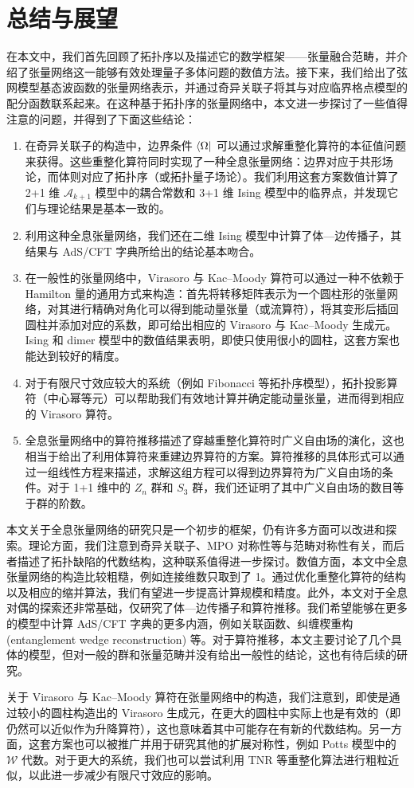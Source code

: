 \chapter{总结与展望}
\label{chap:conclusion}

在本文中，我们首先回顾了拓扑序以及描述它的数学框架——张量融合范畴，并介绍了张量网络这一能够有效处理量子多体问题的数值方法。接下来，我们给出了弦网模型基态波函数的张量网络表示，并通过奇异关联子将其与对应临界格点模型的配分函数联系起来。在这种基于拓扑序的张量网络中，本文进一步探讨了一些值得注意的问题，并得到了下面这些结论：

\begin{enumerate}
  \item 在奇异关联子的构造中，边界条件 $\bra{\Omega}$ 可以通过求解重整化算符的本征值问题来获得。这些重整化算符同时实现了一种全息张量网络：边界对应于共形场论，而体则对应了拓扑序（或拓扑量子场论）。我们利用这套方案数值计算了 2+1 维 $\mathcal{A}_{k+1}$ 模型中的耦合常数和 3+1 维 Ising 模型中的临界点，并发现它们与理论结果是基本一致的。
  \item 利用这种全息张量网络，我们还在二维 Ising 模型中计算了体—边传播子，其结果与 AdS/CFT 字典所给出的结论基本吻合。
  \item 在一般性的张量网络中，Virasoro 与 Kac--Moody 算符可以通过一种不依赖于 Hamilton 量的通用方式来构造：首先将转移矩阵表示为一个圆柱形的张量网络，对其进行精确对角化可以得到能动量张量（或流算符），将其变形后插回圆柱并添加对应的系数，即可给出相应的 Virasoro 与 Kac--Moody 生成元。Ising 和 dimer 模型中的数值结果表明，即使只使用很小的圆柱，这套方案也能达到较好的精度。
  \item 对于有限尺寸效应较大的系统（例如 Fibonacci 等拓扑序模型），拓扑投影算符（中心幂等元）可以帮助我们有效地计算并确定能动量张量，进而得到相应的 Virasoro 算符。
  \item 全息张量网络中的算符推移描述了穿越重整化算符时广义自由场的演化，这也相当于给出了利用体算符来重建边界算符的方案。算符推移的具体形式可以通过一组线性方程来描述，求解这组方程可以得到边界算符为广义自由场的条件。对于 1+1 维中的 $Z_n$ 群和 $S_3$ 群，我们还证明了其中广义自由场的数目等于群的阶数。
\end{enumerate}

本文关于全息张量网络的研究只是一个初步的框架，仍有许多方面可以改进和探索。理论方面，我们注意到奇异关联子、MPO 对称性等与范畴对称性\cite{ji2020categorical,kong2020algebraic,wu2021categorical,lootens2023dualities}\allowbreak 有关，而后者描述了拓扑缺陷的代数结构，这种联系值得进一步探讨。数值方面，本文中全息张量网络的构造比较粗糙，例如连接维数只取到了 1。通过优化重整化算符的结构以及相应的缩并算法，我们有望进一步提高计算规模和精度。此外，本文对于全息对偶的探索还非常基础，仅研究了体—边传播子和算符推移。我们希望能够在更多的模型中计算 AdS/CFT 字典的更多内涵，例如关联函数、纠缠楔重构 (entanglement wedge reconstruction) 等。对于算符推移，本文主要讨论了几个具体的模型，但对一般的群和张量范畴并没有给出一般性的结论，这也有待后续的研究。

关于 Virasoro 与 Kac--Moody 算符在张量网络中的构造，我们注意到，即使是通过较小的圆柱构造出的 Virasoro 生成元，在更大的圆柱中实际上也是有效的（即仍然可以近似作为升降算符），这也意味着其中可能存在有新的代数结构。另一方面，这套方案也可以被推广并用于研究其他的扩展对称性，例如 Potts 模型中的 $\mathcal{W}$ 代数\cite{fateev1987conformal}。对于更大的系统，我们也可以尝试利用 TNR 等重整化算法进行粗粒近似，以此进一步减少有限尺寸效应的影响。
